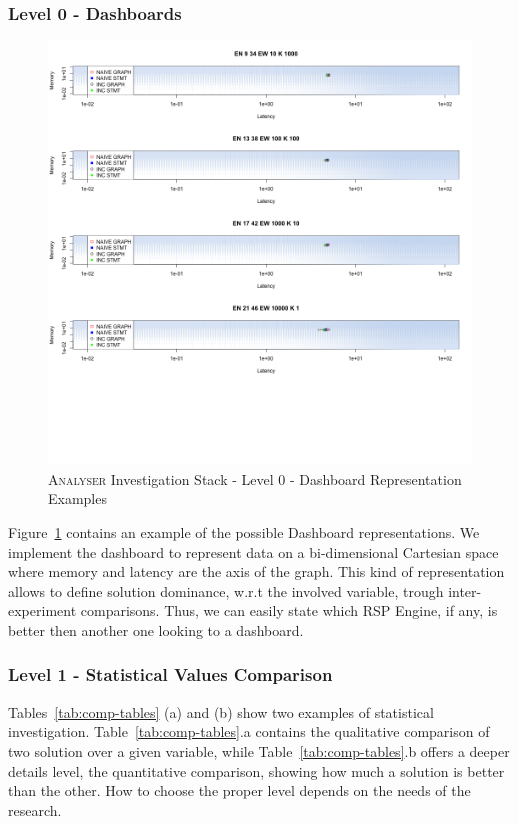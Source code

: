 \subsubsection{Level 0 - Dashboards}\label{sec:impl-level0}

\begin{figure}[h!tbp]
  \centering
	\includegraphics[width=0.45\linewidth]{images/dashboard-example}
	\caption[\textsc{Analyser} Investigation Stack - Level 0 -  Dashboard Representation Examples]{\textsc{Analyser} Investigation Stack - Level 0 -  Dashboard Representation Examples}
  	\label{fig:dashboard-example}
\end{figure}

\noindent Figure~\ref{fig:dashboard-example} contains an example of the possible Dashboard representations. We implement the dashboard to represent data on a bi-dimensional Cartesian space where memory and latency are the axis of the graph. This kind of representation allows to define solution dominance, w.r.t the involved variable, trough inter-experiment comparisons. Thus, we can easily state which RSP Engine, if any, is better then another one looking to a dashboard.

\subsubsection{Level 1 - Statistical Values Comparison}\label{sec:impl-level1}

Tables~\ref{tab:comp-tables} (a) and (b) show two examples of statistical investigation. Table~\ref{tab:comp-tables}.a contains the qualitative comparison of two solution over a given variable, while Table~\ref{tab:comp-tables}.b offers a deeper details level, the quantitative comparison, showing how much a solution is better than the other. How to choose the proper level depends on the needs of the research.


